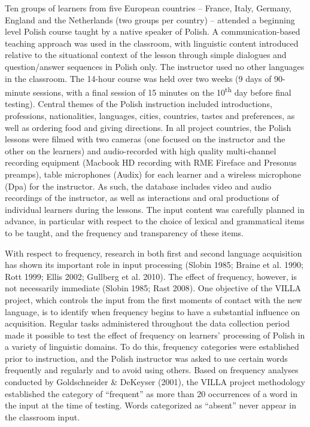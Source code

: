 \documentclass[12pt]{article}
\newenvironment{styleStandard}{\setlength\leftskip{0cm}\setlength\rightskip{0cm plus 1fil}\setlength\parindent{0cm}\setlength\parfillskip{0pt plus 1fil}\setlength\parskip{0cm plus 1pt}\writerlistparindent\writerlistleftskip\leavevmode\normalfont\normalsize\writerlistlabel\ignorespaces}{\unskip\vspace{0cm plus 1pt}\par}
\newcommand\writerlistleftskip{}
\newcommand\writerlistparindent{}
\newcommand\writerlistlabel{}
\begin{document}
\begin{styleStandard}
Ten groups of learners from five European countries – France, Italy, Germany, England and the Netherlands (two groups per country) – attended a beginning level Polish course taught by a native speaker of Polish. A communication-based teaching approach was used in the classroom, with linguistic content introduced relative to the situational context of the lesson through simple dialogues and question/answer sequences in Polish only. The instructor used no other languages in the classroom. The 14-hour course was held over two weeks (9 days of 90-minute sessions, with a final session of 15 minutes on the 10\textsuperscript{th} day before final testing). Central themes of the Polish instruction included introductions, professions, nationalities, languages, cities, countries, tastes and preferences, as well as ordering food and giving directions. In all project countries, the Polish lessons were filmed with two cameras (one focused on the instructor and the other on the learners) and audio-recorded with high quality multi-channel recording equipment (Macbook HD recording with RME Fireface and Presonus preamps), table microphones (Audix) for each learner and a wireless microphone (Dpa) for the instructor. As such, the database includes video and audio recordings of the instructor, as well as interactions and oral productions of individual learners during the lessons. The input content was carefully planned in advance, in particular with respect to the choice of lexical and grammatical items to be taught, and the frequency and transparency of these items. 
\end{styleStandard}

\begin{styleStandard}
With respect to frequency, research in both first and second language acquisition has shown its important role in input processing (Slobin 1985; Braine et al. 1990; Rott 1999; Ellis 2002; Gullberg et al. 2010). The effect of frequency, however, is not necessarily immediate (Slobin 1985; Rast 2008). One objective of the VILLA project, which controls the input from the first moments of contact with the new language, is to identify when frequency begins to have a substantial influence on acquisition. Regular tasks administered throughout the data collection period made it possible to test the effect of frequency on learners’ processing of Polish in a variety of linguistic domains. To do this, frequency categories were established prior to instruction, and the Polish instructor was asked to use certain words frequently and regularly and to avoid using others. Based on frequency analyses conducted by Goldschneider \& DeKeyser (2001), the VILLA project methodology established the category of “frequent” as more than 20 occurrences of a word in the input at the time of testing. Words categorized as “absent” never appear in the classroom input.
\end{styleStandard}
\end{document}
